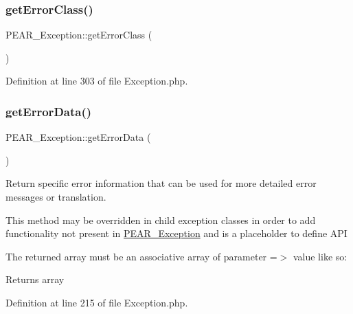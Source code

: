\subsubsection{\texorpdfstring{get\+Error\+Class()}{getErrorClass()}}
{\footnotesize\ttfamily P\+E\+A\+R\+\_\+\+Exception\+::get\+Error\+Class (\begin{DoxyParamCaption}{ }\end{DoxyParamCaption})}



Definition at line 303 of file Exception.\+php.

\hypertarget{classPEAR__Exception_a705ea5e6f32355245137f979221bf5c2}{}\label{classPEAR__Exception_a705ea5e6f32355245137f979221bf5c2} 
\subsubsection{\texorpdfstring{get\+Error\+Data()}{getErrorData()}}
{\footnotesize\ttfamily P\+E\+A\+R\+\_\+\+Exception\+::get\+Error\+Data (\begin{DoxyParamCaption}{ }\end{DoxyParamCaption})}

Return specific error information that can be used for more detailed error messages or translation.

This method may be overridden in child exception classes in order to add functionality not present in \hyperlink{classPEAR__Exception}{P\+E\+A\+R\+\_\+\+Exception} and is a placeholder to define A\+PI

The returned array must be an associative array of parameter =$>$ value like so\+: 
 \begin{DoxyReturn}{Returns}
array 
\end{DoxyReturn}


Definition at line 215 of file Exception.\+php.

\hypertarget{classPEAR__Exception_a423d0dcd3d908d2a39068a0893d17f22}{}\label{classPEAR__Exception_a423d0dcd3d908d2a39068a0893d17f22} 
